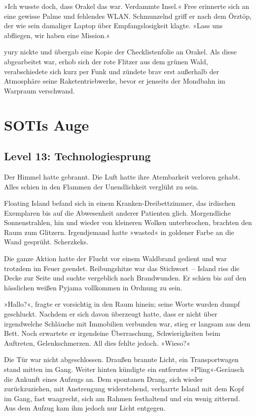 »Ich wusste doch, dass Orakel das war. Verdammte Insel.« Free erinnerte sich an eine gewisse Palme und fehlendes WLAN. Schmunzelnd griff er nach dem Örztöp, der wie sein damaliger Laptop über Empfangslosigkeit klagte. »Lass uns abfliegen, wir haben eine Mission.«

yury nickte und übergab eine Kopie der Checklistenfolie an Orakel. Als diese abgearbeitet war, erhob sich der rote Flitzer aus dem grünen Wald, verabschiedete sich kurz per Funk und zündete brav erst außerhalb der Atmosphäre seine Raketentriebwerke, bevor er jenseits der Mondbahn im Warpraum verschwand.


\chapter{SOTIs Auge}

\section{Level 13: Technologiesprung}

Der Himmel hatte gebrannt. Die Luft hatte ihre Atembarkeit verloren gehabt. Alles schien in den Flammen der Unendlichkeit verglüht zu sein.

Floating Island befand sich in einem Kranken-Dreibettzimmer, das irdischen Exemplaren bis auf die Abwesenheit anderer Patienten glich. Morgendliche Sonnenstrahlen, hin und wieder von kleineren Wolken unterbrochen, brachten den Raum zum Glitzern. Irgendjemand hatte »wasted« in goldener Farbe an die Wand gesprüht. Scherzkeks.

Die ganze Aktion hatte der Flucht vor einem Waldbrand gedient und war trotzdem im Feuer geendet. Reibungshitze war das Stichwort~– Island riss die Decke zur Seite und suchte vergeblich nach Brandwunden. Er schien bis auf den hässlichen weißen Pyjama vollkommen in Ordnung zu sein.

»Hallo?«, fragte er vorsichtig in den Raum hinein; seine Worte wurden dumpf geschluckt. Nachdem er sich davon überzeugt hatte, dass er nicht über irgendwelche Schläuche mit Immobilien verbunden war, stieg er langsam aus dem Bett. Noch erwartete er irgendeine Überraschung, Schwierigkeiten beim Auftreten, Gelenkschmerzen. All dies fehlte jedoch. »Wieso?«

Die Tür war nicht abgeschlossen. Draußen brannte Licht, ein Transportwagen stand mitten im Gang. Weiter hinten kündigte ein entferntes »Pling«-Geräusch die Ankunft eines Aufzugs an. Dem spontanen Drang, sich wieder zurückzuziehen, mit Anstrengung widerstehend, verharrte Island mit dem Kopf im Gang, fast waagrecht, sich am Rahmen festhaltend und ein wenig zitternd. Aus dem Aufzug kam ihm jedoch nur Licht entgegen.

